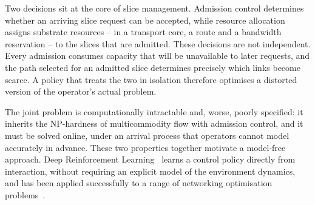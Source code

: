 \documentclass[10pt,journal,comsoc]{IEEEtran}
\begin{document}
Two decisions sit at the core of slice management. Admission control
determines whether an arriving slice request can be accepted, while
resource allocation assigns substrate resources -- in a transport core,
a route and a bandwidth reservation -- to the slices that are admitted.
These decisions are not independent. Every admission consumes capacity
that will be unavailable to later requests, and the path selected for an
admitted slice determines precisely which links become scarce. A policy
that treats the two in isolation therefore optimises a distorted version
of the operator's actual problem.

The joint problem is computationally intractable and, worse, poorly
specified: it inherits the NP-hardness of multicommodity flow with
admission control, and it must be solved online, under an arrival process
that operators cannot model accurately in advance. These two properties
together motivate a model-free approach. Deep Reinforcement
Learning~\cite{sutton2018reinforcement} learns a control policy directly
from interaction, without requiring an explicit model of the environment
dynamics, and has been applied successfully to a range of networking
optimisation problems~\cite{luong2019applications}.
\end{document}

